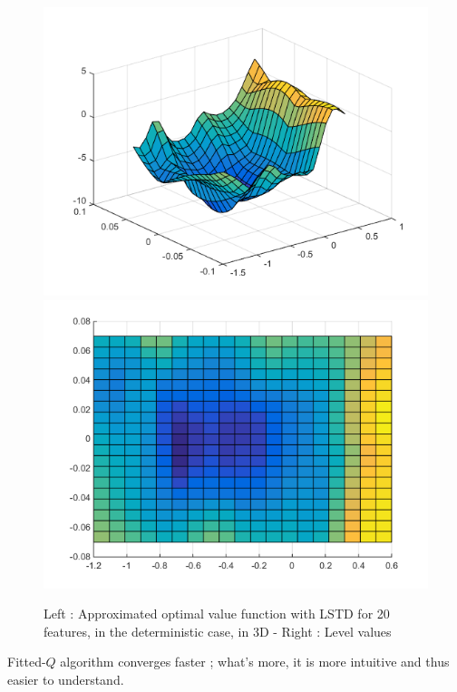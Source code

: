 \documentclass[a4paper, 12pt]{article}
\begin{document}
\begin{figure}[H]
	\centering
	\noindent\includegraphics[scale=0.3]{lstd-30feat-determ.png}
	\noindent\includegraphics[scale=0.3]{lstd-30feat-determ-flat.png}
	\caption{Left : Approximated optimal value function with LSTD for 20 features, in the deterministic case, in 3D - Right : Level values}
\end{figure}


Fitted-$Q$ algorithm converges faster ; what's more, it is more intuitive and thus easier to understand.
\end{document}
